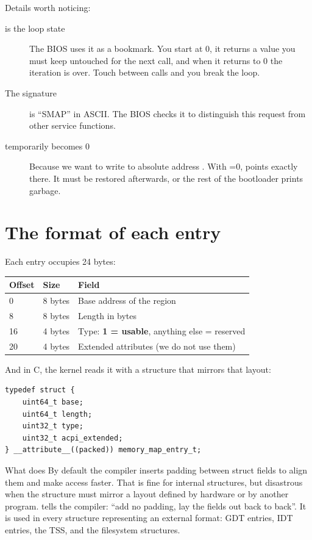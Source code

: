 Details worth noticing:

\begin{description}
  \item[ is the loop state] The BIOS uses it as a bookmark. You start at 0, it returns a
    value you must keep untouched for the next call, and when it returns to 0 the iteration is
    over. Touch  between calls and you break the loop.
  \item[The  signature]  is ``SMAP'' in ASCII. The BIOS checks it to
    distinguish this request from other  service functions.
  \item[ temporarily becomes 0] Because we want to write to absolute address .
    With =0,  points exactly there. It must be restored afterwards, or the
    rest of the bootloader prints garbage.
\end{description}

\section{The format of each entry}

Each entry occupies 24 bytes:

\begin{center}
\begin{tabularx}{0.95\textwidth}{@{}l l X@{}}
\toprule
\textbf{Offset} & \textbf{Size} & \textbf{Field} \\
\midrule
0  & 8 bytes & Base address of the region \\
8  & 8 bytes & Length in bytes \\
16 & 4 bytes & Type: \textbf{1 = usable}, anything else = reserved \\
20 & 4 bytes & Extended attributes (we do not use them) \\
\bottomrule
\end{tabularx}
\end{center}

And in C, the kernel reads it with a structure that mirrors that layout:

\begin{lstlisting}[style=c]
typedef struct {
    uint64_t base;
    uint64_t length;
    uint32_t type;
    uint32_t acpi_extended;
} __attribute__((packed)) memory_map_entry_t;
\end{lstlisting}

\begin{concept}{What  does}
By default the compiler inserts padding between struct fields to align them and make access
faster. That is fine for internal structures, but disastrous when the structure must mirror a
layout defined by hardware or by another program.  tells the compiler: ``add no
padding, lay the fields out back to back''. It is used in every structure representing an external
format: GDT entries, IDT entries, the TSS, and the filesystem structures.
\end{concept}

